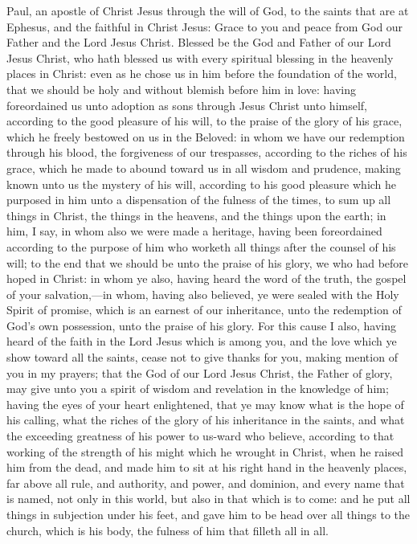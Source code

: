 


Paul, an apostle of Christ Jesus through the will of God, to the saints that are at Ephesus, and the faithful in Christ Jesus: Grace to you and peace from God our Father and the Lord Jesus Christ.  Blessed be the God and Father of our Lord Jesus Christ, who hath blessed us with every spiritual blessing in the heavenly places in Christ: even as he chose us in him before the foundation of the world, that we should be holy and without blemish before him in love: having foreordained us unto adoption as sons through Jesus Christ unto himself, according to the good pleasure of his will, to the praise of the glory of his grace, which he freely bestowed on us in the Beloved: in whom we have our redemption through his blood, the forgiveness of our trespasses, according to the riches of his grace, which he made to abound toward us in all wisdom and prudence, making known unto us the mystery of his will, according to his good pleasure which he purposed in him unto a dispensation of the fulness of the times, to sum up all things in Christ, the things in the heavens, and the things upon the earth; in him, I say, in whom also we were made a heritage, having been foreordained according to the purpose of him who worketh all things after the counsel of his will; to the end that we should be unto the praise of his glory, we who had before hoped in Christ: in whom ye also, having heard the word of the truth, the gospel of your salvation,—in whom, having also believed, ye were sealed with the Holy Spirit of promise, which is an earnest of our inheritance, unto the redemption of God’s own possession, unto the praise of his glory.  For this cause I also, having heard of the faith in the Lord Jesus which is among you, and the love which ye show toward all the saints, cease not to give thanks for you, making mention of you in my prayers; that the God of our Lord Jesus Christ, the Father of glory, may give unto you a spirit of wisdom and revelation in the knowledge of him; having the eyes of your heart enlightened, that ye may know what is the hope of his calling, what the riches of the glory of his inheritance in the saints, and what the exceeding greatness of his power to us-ward who believe, according to that working of the strength of his might which he wrought in Christ, when he raised him from the dead, and made him to sit at his right hand in the heavenly places, far above all rule, and authority, and power, and dominion, and every name that is named, not only in this world, but also in that which is to come: and he put all things in subjection under his feet, and gave him to be head over all things to the church, which is his body, the fulness of him that filleth all in all. 

